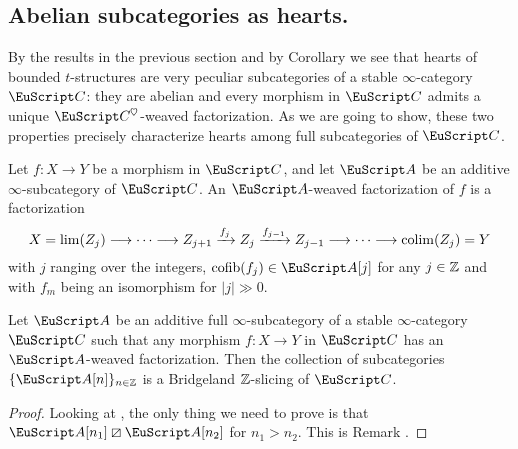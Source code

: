 \subsection{Abelian subcategories as hearts.}
By the results in the previous section and by Corollary  we see that hearts of bounded $t$-structures are very peculiar subcategories of a stable $\infty$-category $\C$: they are abelian and every morphism in $\C$ admits a unique $\C^\heart$-weaved factorization. As we are going to show, these two properties precisely characterize hearts among full subcategories of $\C$.
{\color{green!40!black}
\begin{definition}
Let $f\colon X\to Y$ be a morphism in $\C$, and let $\cA$ be an additive $\infty$-subcategory of $\C$. An $\cA$-weaved factorization of $f$ is a factorization
\[
X=\lim(Z_j) \longrightarrow\cdots \longrightarrow Z_{j+1} \xrightarrow{f_{j}} Z_{j} \xrightarrow{f_{j-1}}Z_{j-1}\longrightarrow \cdots\longrightarrow \mathrm{colim}(Z_j)=Y
\]
with $j$ ranging over the integers, $\cofib(f_j)\in \cA[j]$ for any $j\in \mathbb{Z} $ and with $f_m$ being an isomorphism for $|j|\gg 0$.
\end{definition}

\begin{proposition}
Let $\cA$ be an additive full $\infty$-subcategory of a stable $\infty$-category $\C$ such that any morphism $f\colon X\to Y$  in $\C$ has an $\cA$-weaved factorization. Then the collection of subcategories $\{\cA[n]\}_{n\in \Z}$ is a Bridgeland $\mathbb{Z}$-slicing of $\C$.
\end{proposition}
\begin{proof} Looking at \adef{}, the only thing we need to prove is that $\cA[n_1]\orth\cA[n_2]$ for $n_1>n_2$. This is Remark .
\end{proof}


}
